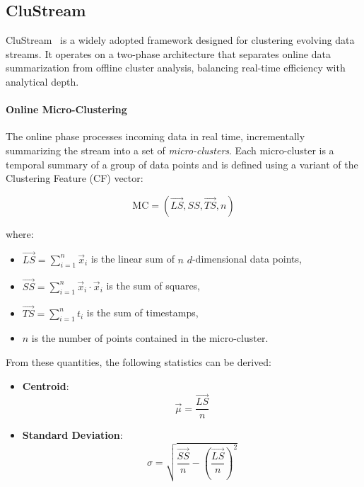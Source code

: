 \subsection{CluStream}\label{subsec:clustream}

CluStream~\cite{clustream} is a widely adopted framework designed for
clustering evolving data streams. It operates on a two-phase architecture that
separates online data summarization from offline cluster analysis, balancing
real-time efficiency with analytical depth.

\paragraph{Online Micro-Clustering} The online phase processes incoming data in real time, incrementally
summarizing the stream into a set of \textit{micro-clusters}. Each
micro-cluster is a temporal summary of a group of data points and is defined
using a variant of the Clustering Feature (CF) vector:

\begin{equation}
    \text{MC} = \left( \vec{LS}, SS, \vec{TS}, n \right)
\end{equation}

where:
\begin{itemize}
    \item $\vec{LS} = \sum_{i=1}^{n} \vec{x}_i$ is the linear sum of $n$ $d$-dimensional data points,
    \item $\vec{SS} = \sum_{i=1}^{n} \vec{x}_i \cdot \vec{x}_i$ is the sum of squares,
    \item $\vec{TS} = \sum_{i=1}^{n} t_i$ is the sum of timestamps,
    \item $n$ is the number of points contained in the micro-cluster.
\end{itemize}

From these quantities, the following statistics can be derived:
\begin{itemize}
    \item \textbf{Centroid}:
          \begin{equation}
              \vec{\mu} = \frac{\vec{LS}}{n}
          \end{equation}
    \item \textbf{Standard Deviation}:
          \begin{equation}
              \sigma = \sqrt{ \frac{\vec{SS}}{n} - \left( \frac{\vec{LS}}{n} \right)^2 }
          \end{equation}
\end{itemize}

